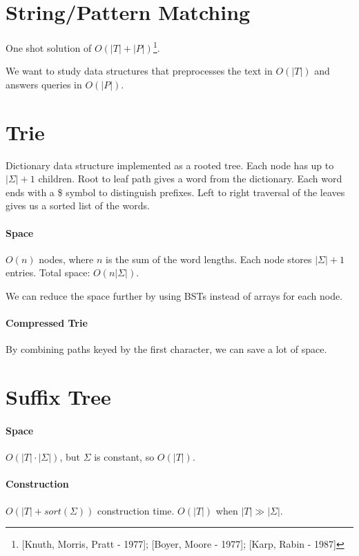 \documentclass[a4paper]{article}
\begin{document}
\section{String/Pattern Matching}

One shot solution of $O(|T|+|P|)$\footnote{[Knuth, Morris, Pratt - 1977]; [Boyer, Moore - 1977]; [Karp, Rabin - 1987]}.

We want to study data structures that preprocesses the text in $O(|T|)$ and answers queries in $O(|P|)$.

\section{Trie}
Dictionary data structure implemented as a rooted tree.
Each node has up to $|\Sigma|+1$ children.
Root to leaf path gives a word from the dictionary.
Each word ends with a \$ symbol to distinguish prefixes.
Left to right traversal of the leaves gives us a sorted list of the words.

\paragraph{Space}
$O(n)$ nodes, where $n$ is the sum of the word lengths.
Each node stores $|\Sigma|+1$ entries.
Total space: $O(n|\Sigma|)$.

We can reduce the space further by using BSTs instead of arrays for each node.

\paragraph{Compressed Trie}
By combining paths keyed by the first character, we can save a lot of space.

\section{Suffix Tree}

\paragraph{Space}
$O(|T|\cdot |\Sigma|)$, but $\Sigma$ is constant, so $O(|T|)$.

\paragraph{Construction}
$O(|T|+sort(\Sigma))$ construction time. $O(|T|)$ when $|T|\gg |\Sigma|$.
\end{document}
